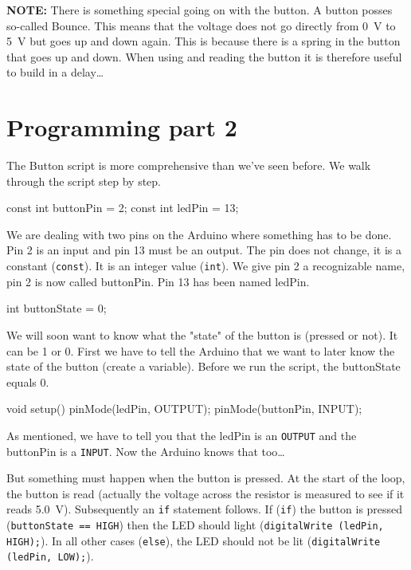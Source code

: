 \documentclass{arduino}
\begin{document}

\textbf{NOTE:} There is something special going on with the button. A button posses so-called Bounce. This means that the voltage does not go directly from \SI{0}{\volt} to \SI{5}{\volt} but goes up and down again. This is because there is a spring in the button that goes up and down. When using and reading the button it is therefore useful to build in a delay\dots

\newpage

\section{Programming part 2}

The Button script is more comprehensive than we've seen before. We walk through the script step by step.

\begin{marginlisting}
const int buttonPin = 2;
const int ledPin = 13;
\end{marginlisting}

We are dealing with two pins on the Arduino where something has to be done. Pin 2 is an input and pin 13 must be an output. The pin does not change, it is a constant (\lstinline{const}). It is an integer value (\lstinline{int}). We give pin 2 a recognizable name, pin 2 is now called buttonPin. Pin 13 has been named ledPin.

\begin{marginlisting}
int buttonState = 0;
\end{marginlisting}

We will soon want to know what the "state" of the button is (pressed or not). It can be 1 or 0. First we have to tell the Arduino that we want to later know the state of the button (create a variable). Before we run the script, the buttonState equals 0.

\begin{marginlisting}
void setup() {
  pinMode(ledPin, OUTPUT);
  pinMode(buttonPin, INPUT);
}
\end{marginlisting}

As mentioned, we have to tell you that the ledPin is an \lstinline{OUTPUT} and the buttonPin is a \lstinline{INPUT}. Now the Arduino knows that too\dots

But something must happen when the button is pressed. At the start of the loop, the button is read (actually the voltage across the resistor is measured to see if it reads \SI{5.0}{\volt}). Subsequently an \lstinline{if} statement follows. If (\lstinline{if}) the button is pressed (\lstinline{buttonState == HIGH}) then the LED should light (\lstinline{digitalWrite (ledPin, HIGH);}). In all other cases (\lstinline{else}), the LED should not be lit (\lstinline{digitalWrite (ledPin, LOW);}).
\end{document}
